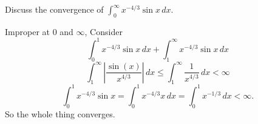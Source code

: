 \documentclass[10pt, a4paper]{article}
\begin{document}
\begin{problem}
    Discuss the convergence of $\int_{0}^{\infty}x ^ {-4 / 3}\sin{x}\,dx$.

    \begin{solution}
        Improper at $0$ and $\infty$,
        Consider
        \[
        \int_{0}^{1}x ^ {-4 / 3}\sin{x}\,dx + \int_{1}^{\infty}x ^ {-4 / 3}\sin{x}\,dx
        \]
        \[
        \int_{1}^{\infty}\left|\frac{\sin(x)}{x ^ {4 / 3}}\right|\,dx \leq \int_{1}^{\infty}\frac{1}{x ^ {4 / 3}}\,dx < \infty
        \]
        \[
        \int_{0}^{1}x ^ {-4 / 3}\sin{x} = \int_{0}^{1}x ^ {-4 / 3}x\,dx = \int_{0}^{1}x ^ {-1 / 3}\,dx < \infty.
        \]
        So the whole thing converges.
    \end{solution}
\end{problem}
\end{document}

